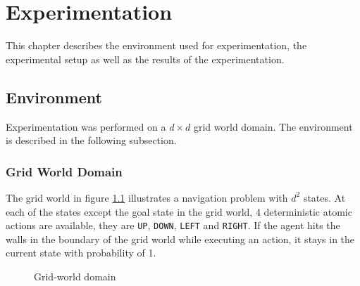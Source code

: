 
\chapter{Experimentation}

This chapter describes the environment used for experimentation, the experimental setup as well as the results of the experimentation.

\section{Environment}

Experimentation was performed on a $d \times d$ grid world domain. The environment is described in the following subsection.

\subsection*{Grid World Domain}

The grid world in figure \ref{fig:grid_domain} illustrates a navigation problem with $d^2$ states.
At each of the states except the goal state in the grid world, 4 deterministic atomic actions are available, they are \texttt{UP}, \texttt{DOWN}, \texttt{LEFT} and \texttt{RIGHT}.
If the agent hits the walls in the boundary of the grid world while executing an action, it stays in the current state with probability of 1.

\begin{figure}[!htbp]
    \centering
    
    \caption{Grid-world domain}
    \label{fig:grid_domain}
\end{figure}

